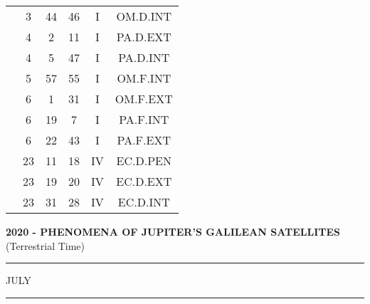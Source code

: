 \documentclass[12pt, a4paper]{article}
\begin{document}
\begin{multicols}{3}
{\begin{tabular}{c c c c c c}
	 	 	 	 & 3 & 44 & 46 & I & OM.D.INT\\%
	 	 	 	 & 4 & 2 & 11 & I & PA.D.EXT\\%
	 	 	 	 & 4 & 5 & 47 & I & PA.D.INT\\%
	 	 	 	 & 5 & 57 & 55 & I & OM.F.INT\\%
	 	 	 	 & 6 & 1 & 31 & I & OM.F.EXT\\%
	 	 	 	 & 6 & 19 & 7 & I & PA.F.INT\\%
	 	 	 	 & 6 & 22 & 43 & I & PA.F.EXT\\%
	 	 	 	 & 23 & 11 & 18 & IV & EC.D.PEN\\%
	 	 	 	 & 23 & 19 & 20 & IV & EC.D.EXT\\%
	 	 	 	 & 23 & 31 & 28 & IV & EC.D.INT\\%
	 	 \end{tabular}
 	}
\end{multicols}
\textbf{2020 - PHENOMENA OF JUPITER'S GALILEAN SATELLITES}\\(Terrestrial Time) 
\vspace{0.1cm} \hrule \vspace{0.1cm}
JULY\vspace{0.1cm}
\hrule
\vspace{-0.2cm}
\end{document}
